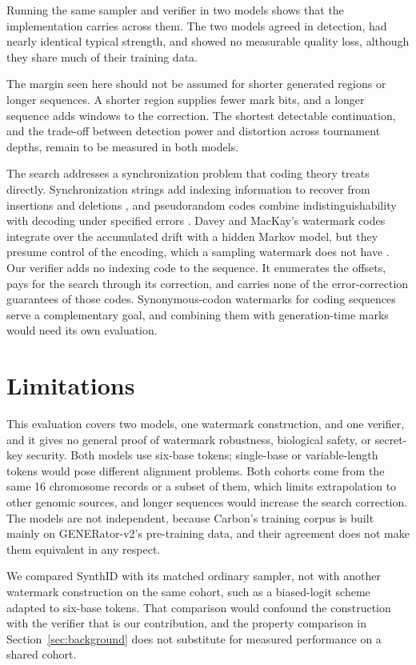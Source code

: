 \documentclass[10pt,twocolumn]{article}
\begin{document}
Running the same sampler and verifier in two models shows that the implementation carries across
them. The two models agreed in detection, had nearly identical typical strength, and showed no
measurable quality loss, although they share much of their training data.

The margin seen here should not be assumed for shorter generated regions or longer sequences. A
shorter region supplies fewer mark bits, and a longer sequence adds windows to the correction. The
shortest detectable continuation, and the trade-off between detection power and distortion across
tournament depths, remain to be measured in both models.

The search addresses a synchronization problem that coding theory treats directly.
Synchronization strings add indexing information to recover from insertions and deletions
\cite{haeupler2017synchronization}, and pseudorandom codes combine indistinguishability with
decoding under specified errors \cite{christ2024prc}. Davey and MacKay's watermark codes integrate
over the accumulated drift with a hidden Markov model, but they presume control of the encoding,
which a sampling watermark does not have \cite{davey2001reliable}. Our verifier adds no indexing
code to the sequence. It enumerates the offsets, pays for the search through its correction, and
carries none of the error-correction guarantees of those codes. Synonymous-codon watermarks for
coding sequences \cite{zhang2025securing} serve a complementary goal, and combining them with
generation-time marks would need its own evaluation.

\section{Limitations}
\label{sec:limitations}

This evaluation covers two models, one watermark construction, and one verifier, and it gives no
general proof of watermark robustness, biological safety, or secret-key security. Both models use
six-base tokens; single-base or variable-length tokens would pose different alignment problems.
Both cohorts come from the same 16 chromosome records or a subset of them, which limits
extrapolation to other genomic sources, and longer sequences would increase the search correction. The
models are not independent, because Carbon's training corpus is built mainly on GENERator-v2's
pre-training data, and their agreement does not make them equivalent in any respect.

We compared SynthID with its matched ordinary sampler, not with another watermark construction on
the same cohort, such as a biased-logit scheme adapted to six-base tokens. That comparison would
confound the construction with the verifier that is our contribution, and the property comparison
in Section~\ref{sec:background} does not substitute for measured performance on a shared cohort.
\end{document}
